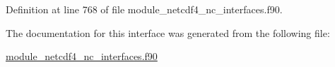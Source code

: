 Definition at line 768 of file module\+\_\+netcdf4\+\_\+nc\+\_\+interfaces.\+f90.



The documentation for this interface was generated from the following file\+:\begin{DoxyCompactItemize}
\item 
\hyperlink{module__netcdf4__nc__interfaces_8f90}{module\+\_\+netcdf4\+\_\+nc\+\_\+interfaces.\+f90}\end{DoxyCompactItemize}
